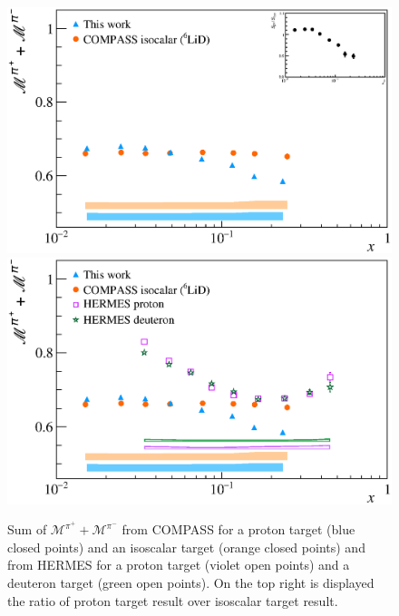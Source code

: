 \begin{figure}[!h]
  \centering
	\includegraphics[scale=0.5]{./gfx/Mult_pi_sum_noH.eps}
  \includegraphics[scale=0.5]{./gfx/Mult_pi_sum.eps}
  \caption{Sum of $\mathscr{M}^{\pi^+}+\mathscr{M}^{\pi^-}$ from COMPASS for a proton target (blue closed points) and an isoscalar target (orange closed points) and from HERMES for a proton target (violet open points) and a deuteron target (green open points). On the top right is displayed the ratio of proton target result over isoscalar target result.}
  \label{pic:pisum}
\end{figure}

